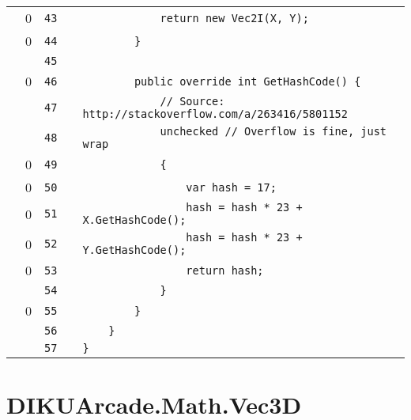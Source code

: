 \documentclass[a4paper,landscape,10pt]{article}
\begin{document}
\begin{longtable}[l]{lrrll}
\cellcolor{red} & 0 & \verb~43~ & & \verb~            return new Vec2I(X, Y);~\\
\cellcolor{red} & 0 & \verb~44~ & & \verb~        }~\\
\cellcolor{gray} &  & \verb~45~ & & \verb~~\\
\cellcolor{red} & 0 & \verb~46~ & & \verb~        public override int GetHashCode() {~\\
\cellcolor{gray} &  & \verb~47~ & & \verb~            // Source: http://stackoverflow.com/a/263416/5801152~\\
\cellcolor{gray} &  & \verb~48~ & & \verb~            unchecked // Overflow is fine, just wrap~\\
\cellcolor{red} & 0 & \verb~49~ & & \verb~            {~\\
\cellcolor{red} & 0 & \verb~50~ & & \verb~                var hash = 17;~\\
\cellcolor{red} & 0 & \verb~51~ & & \verb~                hash = hash * 23 + X.GetHashCode();~\\
\cellcolor{red} & 0 & \verb~52~ & & \verb~                hash = hash * 23 + Y.GetHashCode();~\\
\cellcolor{red} & 0 & \verb~53~ & & \verb~                return hash;~\\
\cellcolor{gray} &  & \verb~54~ & & \verb~            }~\\
\cellcolor{red} & 0 & \verb~55~ & & \verb~        }~\\
\cellcolor{gray} &  & \verb~56~ & & \verb~    }~\\
\cellcolor{gray} &  & \verb~57~ & & \verb~}~\\
\end{longtable}
\newpage
\section{DIKUArcade.Math.Vec3D}
\end{document}
